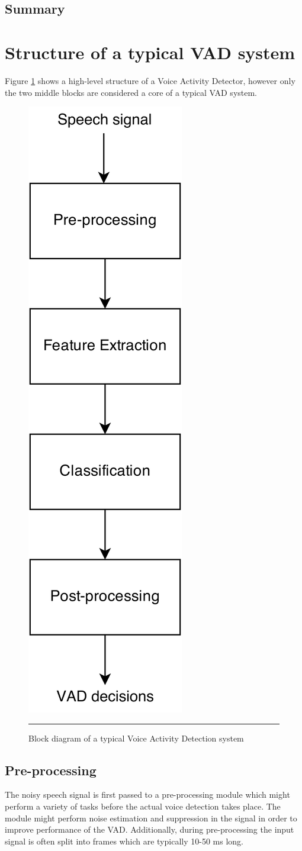 \subsection{Summary}


\section{Structure of a typical VAD system}

Figure \ref{fig:VADStructure} shows a high-level structure of a Voice Activity Detector, however only the two middle blocks are considered a core of a typical VAD system.

\begin{figure}[htbp]
	\centering
		\includegraphics[width=0.15\columnwidth]{Figures/VADStructure2.png}
		\rule{37em}{0.5pt}
	\caption[Block diagram of a typical Voice Activity Detection system]{Block diagram of a typical Voice Activity Detection system}
	\label{fig:VADStructure}
\end{figure}

\subsection{Pre-processing}

The noisy speech signal is first passed to a pre-processing module which might perform a variety of tasks before the actual voice detection takes place. The module might perform noise estimation and suppression in the signal in order to improve performance of the VAD. Additionally, during pre-processing the input signal is often split into frames which are typically 10-50 ms long.

